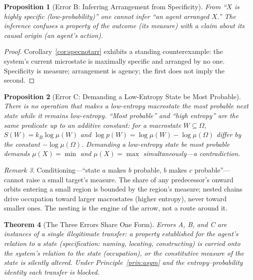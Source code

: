 \documentclass[twocolumn,10pt,a4paper]{article}
\theoremstyle{thmstyle}
\newtheorem{theorem}{Theorem}[section]
\newtheorem{proposition}[theorem]{Proposition}
\theoremstyle{definition}
\theoremstyle{remark}
\newtheorem{remark}[theorem]{Remark}
\begin{document}
\begin{proposition}[Error B: Inferring Arrangement from Specificity]
\label{prop:errB}
From ``$X$ is highly specific (low-probability)'' one cannot infer
``an agent arranged $X$.'' The inference confuses a property of the
outcome (its measure) with a claim about its causal origin (an
agent's action).
\end{proposition}

\begin{proof}
Corollary~\ref{cor:specnotarr} exhibits a standing counterexample:
the system's current microstate is maximally specific and arranged
by no one. Specificity is measure; arrangement is agency; the first
does not imply the second.
\end{proof}

\begin{proposition}[Error C: Demanding a Low-Entropy State be Most Probable]
\label{prop:errC}
There is no operation that makes a low-entropy macrostate the most
probable next state while it remains low-entropy. ``Most probable''
and ``high entropy'' are the same predicate up to an additive
constant: for a macrostate $W\subseteq\Omega$, $S(W)=k_{B}\log\mu(W)$
and $\log p(W)=\log\mu(W)-\log\mu(\Omega)$ differ by the constant
$-\log\mu(\Omega)$. Demanding a low-entropy state be most probable
demands $\mu(X)=\min$ and $\mu(X)=\max$ simultaneously---a
contradiction.
\end{proposition}

\begin{remark}
\label{rem:nesting}
Conditioning---``state $a$ makes $b$ probable, $b$ makes $c$
probable''---cannot raise a small target's measure. The share of any
predecessor's onward orbits entering a small region is bounded by the
region's measure; nested chains drive occupation toward larger
macrostates (higher entropy), never toward smaller ones. The nesting
is the engine of the arrow, not a route around it.
\end{remark}

\begin{theorem}[The Three Errors Share One Form]
\label{thm:oneform}
Errors A, B, and C are instances of a single illegitimate transfer:
a property established for the agent's relation to a state
(specification: naming, locating, constructing) is carried onto the
system's relation to the state (occupation), or the constitutive
measure of the state is silently altered. Under
Principle~\ref{prin:asym} and the entropy--probability identity each
transfer is blocked.
\end{theorem}
\end{document}
